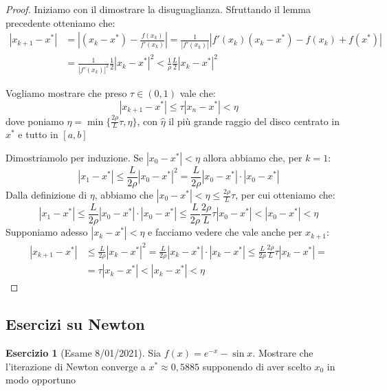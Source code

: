 \documentclass[11pt,a4paper,twoside]{article}
\theoremstyle{definition}
\newtheorem*{ese}{Esercizio}
\begin{document}
\begin{proof}
	 Iniziamo con il dimostrare la disuguaglianza. Sfruttando il lemma precedente otteniamo che:
	\begin{align*}
		|x_{k+1} - x^*| &= \left|(x_k-x^*) - \frac{f(x_k)}{f'(x_k)} \right| = \frac{1}{|f'(x_k)|}|f'(x_k)(x_k-x^*) - f(x_k) + f(x^*)|\\
		&= \frac 1{|f'(x_k)|^2} \frac 12 |x_k-x^*|^2 < \frac 1 \rho \frac L2 |x_k - x^*|^2
	\end{align*}

	 Vogliamo mostrare che preso $\tau \in (0,1)$ vale che:
	\[ |x_{k+1}-x^*| \leq \tau |x_n - x^*|<\eta \]
	dove poniamo $\eta = \min\{\frac{2\rho}{L}\tau, \hat \eta\}$, con $\hat \eta$ il più grande raggio del disco centrato in $x^*$ e tutto in $[a,b]$
	\begin{center}
	\end{center}
	Dimostriamolo per induzione. Se $|x_0-x^*|<\eta$ allora abbiamo che, per $k = 1$:
	\[ |x_1-x^*| \leq \frac L{2 \rho} |x_0 - x^*|^2 = \frac L{2 \rho} |x_0-x^*|\cdot |x_0-x^*|\]
	Dalla definizione di $\eta$, abbiamo che $|x_0-x^*|<\eta\leq \frac{2\rho}L \tau$, per cui otteniamo che:
	\[ |x_1-x^*|\leq \frac L{2\rho} |x_0 - x^*| \cdot |x_0-x^*| \leq \frac L{2 \rho} \frac{2\rho}L \tau|x_0-x^*| <|x_0-x^*|<\eta \]
	Supponiamo adesso $|x_k-x^*|<\eta$ e facciamo vedere che vale anche per $x_{k+1}$:
	\begin{align*}
		|x_{k+1} - x^*| & \leq \frac L{2\rho}|x_k-x^*|^2 = \frac{L}{2\rho} |x_k - x^*| \cdot |x_k-x^*| \leq \frac{L}{2 \rho} \frac{2\rho}L \tau |x_k - x^*| =\\
		&= \tau |x_k - x^*| < |x_k - x^*| < \eta
	\end{align*}
\end{proof}

\subsection{Esercizi su Newton}

\begin{ese}[Esame 8/01/2021]
	Sia $f(x) = e^{-x} - \sin x$. Mostrare che l'iterazione di Newton converge a $x^* \approx 0,5885$ supponendo di aver scelto $x_0$ in modo opportuno
\end{ese}
\end{document}
